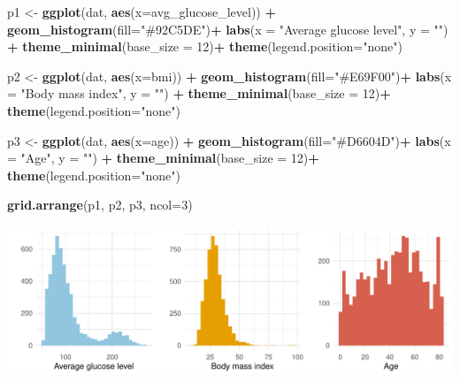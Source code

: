 \documentclass[
]{article}
\newenvironment{Shaded}{\begin{snugshade}}{\end{snugshade}}
\newcommand{\AttributeTok}[1]{\textcolor[rgb]{0.13,0.29,0.53}{#1}}
\newcommand{\DecValTok}[1]{\textcolor[rgb]{0.00,0.00,0.81}{#1}}
\newcommand{\FunctionTok}[1]{\textcolor[rgb]{0.13,0.29,0.53}{\textbf{#1}}}
\newcommand{\NormalTok}[1]{#1}
\newcommand{\OtherTok}[1]{\textcolor[rgb]{0.56,0.35,0.01}{#1}}
\newcommand{\SpecialCharTok}[1]{\textcolor[rgb]{0.81,0.36,0.00}{\textbf{#1}}}
\newcommand{\StringTok}[1]{\textcolor[rgb]{0.31,0.60,0.02}{#1}}
\begin{document}
\begin{Shaded}
\begin{Highlighting}[]
\NormalTok{p1 }\OtherTok{\textless{}{-}} \FunctionTok{ggplot}\NormalTok{(dat, }\FunctionTok{aes}\NormalTok{(}\AttributeTok{x=}\NormalTok{avg\_glucose\_level)) }\SpecialCharTok{+}  
      \FunctionTok{geom\_histogram}\NormalTok{(}\AttributeTok{fill=}\StringTok{"\#92C5DE"}\NormalTok{)}\SpecialCharTok{+}
      \FunctionTok{labs}\NormalTok{(}\AttributeTok{x =} \StringTok{"Average glucose level"}\NormalTok{, }\AttributeTok{y =} \StringTok{""}\NormalTok{) }\SpecialCharTok{+}
      \FunctionTok{theme\_minimal}\NormalTok{(}\AttributeTok{base\_size =} \DecValTok{12}\NormalTok{)}\SpecialCharTok{+}
      \FunctionTok{theme}\NormalTok{(}\AttributeTok{legend.position=}\StringTok{"none"}\NormalTok{)}


\NormalTok{p2 }\OtherTok{\textless{}{-}} \FunctionTok{ggplot}\NormalTok{(dat, }\FunctionTok{aes}\NormalTok{(}\AttributeTok{x=}\NormalTok{bmi)) }\SpecialCharTok{+}  
      \FunctionTok{geom\_histogram}\NormalTok{(}\AttributeTok{fill=}\StringTok{"\#E69F00"}\NormalTok{)}\SpecialCharTok{+}
      \FunctionTok{labs}\NormalTok{(}\AttributeTok{x =} \StringTok{"Body mass index"}\NormalTok{, }\AttributeTok{y =} \StringTok{""}\NormalTok{) }\SpecialCharTok{+}
      \FunctionTok{theme\_minimal}\NormalTok{(}\AttributeTok{base\_size =} \DecValTok{12}\NormalTok{)}\SpecialCharTok{+}
      \FunctionTok{theme}\NormalTok{(}\AttributeTok{legend.position=}\StringTok{"none"}\NormalTok{)}


\NormalTok{p3 }\OtherTok{\textless{}{-}} \FunctionTok{ggplot}\NormalTok{(dat, }\FunctionTok{aes}\NormalTok{(}\AttributeTok{x=}\NormalTok{age)) }\SpecialCharTok{+}  
      \FunctionTok{geom\_histogram}\NormalTok{(}\AttributeTok{fill=}\StringTok{"\#D6604D"}\NormalTok{)}\SpecialCharTok{+}
      \FunctionTok{labs}\NormalTok{(}\AttributeTok{x =} \StringTok{"Age"}\NormalTok{, }\AttributeTok{y =} \StringTok{""}\NormalTok{) }\SpecialCharTok{+}
      \FunctionTok{theme\_minimal}\NormalTok{(}\AttributeTok{base\_size =} \DecValTok{12}\NormalTok{)}\SpecialCharTok{+}
      \FunctionTok{theme}\NormalTok{(}\AttributeTok{legend.position=}\StringTok{"none"}\NormalTok{)}


\FunctionTok{grid.arrange}\NormalTok{(p1, p2, p3, }\AttributeTok{ncol=}\DecValTok{3}\NormalTok{)}
\end{Highlighting}
\end{Shaded}

\includegraphics{Build-deploy-stroke-prediction-model-R_files/figure-latex/hist-plots-1.pdf}
\end{document}
